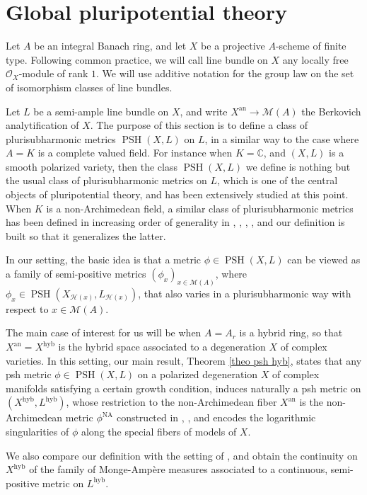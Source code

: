 \documentclass[JEP,XML,SOM,Unicode,published]{cedram}
\theoremstyle{definition}
\newcommand \C{\mathbb C}
\newcommand \gO {\mathcal O}
\newcommand \M {\mathscr {M}}
\newcommand{\an}{\mathrm{an}}
\newcommand{\hyb}{\mathrm{hyb}}
\DeclareMathOperator{\NA}{NA}
\DeclareMathOperator{\PSH}{PSH}
\begin{document}
\section{Global pluripotential theory} \label{sec NA ppt}
Let $A$ be an integral Banach ring, and let $X$ be a projective $A$-scheme of finite type. Following common practice, we will call line bundle on $X$ any locally free $\gO_X$-module of rank $1$. We will use additive notation for the group law on the set of isomorphism classes of line bundles.

Let $L$ be a semi-ample line bundle on $X$, and write $X^{\an} \to \M(A)$ the Berkovich analytification of $X$. The purpose of this section is to define a class of plurisubharmonic metrics $\PSH(X, L)$ on $L$, in a similar way to the case where $A=K$ is a complete valued field. For instance when $K = \C$, and $(X, L)$ is a smooth polarized variety, then the class $\PSH(X, L)$ we define is nothing but the usual class of plurisubharmonic metrics on $L$, which is one of the central objects of pluripotential theory, and has been extensively studied at this point. When $K$ is a non-Archimedean field, a similar class of plurisubharmonic metrics has been defined in increasing order of generality in \cite{Zha}, \cite{Gub}, \cite{BFJ2}, \cite{BE}, and our definition is built so that it generalizes the latter.

In our setting, the basic idea is that a metric $\phi \in \PSH(X, L)$ can be viewed as a family of semi-positive metrics $(\phi_x)_{x \in \M(A)}$, where $\phi_x \in \PSH(X_{\mathscr{H}(x)}, L_{\mathscr{H}(x)})$, that also varies in a plurisubharmonic way with respect to $x \in \M(A)$.

The main case of interest for us will be when $A = A_r$ is a hybrid ring, so that $X^{\an} = X^{\hyb}$ is the hybrid space associated to a degeneration $X$ of complex vari\-eties. In this setting, our main result, Theorem \ref{theo psh hyb}, states that any psh metric $\phi \in \PSH(X,L)$ on a polarized degeneration $X$ of complex manifolds satisfying a certain growth condition, induces naturally a psh metric on $(X^{\hyb}, L^{\hyb})$, whose restriction to the non-Archimedean fiber $X^{\an}$ is the non-Archimedean metric $\phi^{\NA}$ constructed in \cite{BBJ}, \cite{Reb}, and encodes the logarithmic singularities of $\phi$ along the special fibers of models of $X$.

We also compare our definition with the setting of \cite{Fav}, and obtain the continuity on $X^{\hyb}$ of the family of Monge-Ampère measures associated to a continuous, semi-positive metric on $L^{\hyb}$.
\end{document}
